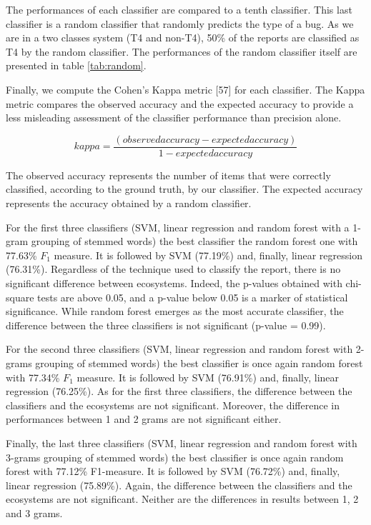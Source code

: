 \documentclass[12pt]{report}
\begin{document}
The performances of each classifier are compared to a tenth classifier.
This last classifier is a random classifier that randomly predicts the
type of a bug. As we are in a two classes system (T4 and non-T4), 50\%
of the reports are classified as T4 by the random classifier. The
performances of the random classifier itself are presented in table
\ref{tab:random}.

Finally, we compute the Cohen's Kappa metric {[}57{]} for each
classifier. The Kappa metric compares the observed accuracy and the
expected accuracy to provide a less misleading assessment of the
classifier performance than precision alone.

\begin{equation}
kappa = \frac{(observed accuracy - expected accuracy)}{1 - expected accuracy}
\end{equation}

The observed accuracy represents the number of items that were correctly
classified, according to the ground truth, by our classifier. The
expected accuracy represents the accuracy obtained by a random
classifier.



For the first three classifiers (SVM, linear regression and random
forest with a 1-gram grouping of stemmed words) the best classifier the
random forest one with 77.63\% \(F_1\) measure. It is followed by SVM
(77.19\%) and, finally, linear regression (76.31\%). Regardless of the
technique used to classify the report, there is no significant
difference between ecosystems. Indeed, the p-values obtained with
chi-square tests are above 0.05, and a p-value below 0.05 is a marker of
statistical significance. While random forest emerges as the most
accurate classifier, the difference between the three classifiers is not
significant (p-value = 0.99).



For the second three classifiers (SVM, linear regression and random
forest with 2-grams grouping of stemmed words) the best classifier is
once again random forest with 77.34\% \(F_1\) measure. It is followed by
SVM (76.91\%) and, finally, linear regression (76.25\%). As for the
first three classifiers, the difference between the classifiers and the
ecosystems are not significant. Moreover, the difference in performances
between 1 and 2 grams are not significant either.



Finally, the last three classifiers (SVM, linear regression and random
forest with 3-grams grouping of stemmed words) the best classifier is
once again random forest with 77.12\% F1-measure. It is followed by SVM
(76.72\%) and, finally, linear regression (75.89\%). Again, the
difference between the classifiers and the ecosystems are not
significant. Neither are the differences in results between 1, 2 and 3
grams.
\end{document}
